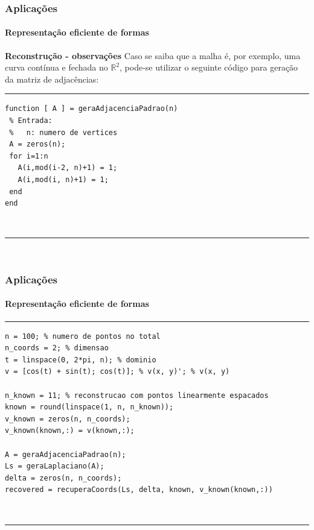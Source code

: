 \begin{frame}[fragile]
\frametitle{{\bf \color{blue} Aplicações}}
\framesubtitle{\color{blue} Representação eficiente de formas}

\begin{block}{\bf Reconstrução - observações}
Caso se saiba que a malha é, por exemplo, uma curva contínua e fechada no $\mathbb{R}^2$, pode-se utilizar o seguinte código para geração da matriz de adjacências:
\end{block}

\begin{Codigo}
\noindent\rule{11.2cm}{1.pt}
\vspace{-0.2cm}
\begin{verbatim}
function [ A ] = geraAdjacenciaPadrao(n)
 % Entrada:
 %   n: numero de vertices
 A = zeros(n);
 for i=1:n
   A(i,mod(i-2, n)+1) = 1;
   A(i,mod(i, n)+1) = 1;
 end
end
\end{verbatim}\\
\vspace{-0.5cm}
\noindent\rule{11.2cm}{1.pt}\\
\end{Codigo}
\end{frame}


\begin{frame}[fragile]
\frametitle{{\bf \color{blue} Aplicações}}
\framesubtitle{\color{blue} Representação eficiente de formas}

\begin{Codigo}
\noindent\rule{11.2cm}{1.pt}
\vspace{-0.2cm}
\begin{verbatim}
n = 100; % numero de pontos no total
n_coords = 2; % dimensao
t = linspace(0, 2*pi, n); % dominio
v = [cos(t) + sin(t); cos(t)]; % v(x, y)'; % v(x, y)

n_known = 11; % reconstrucao com pontos linearmente espacados
known = round(linspace(1, n, n_known));
v_known = zeros(n, n_coords);
v_known(known,:) = v(known,:);

A = geraAdjacenciaPadrao(n);
Ls = geraLaplaciano(A);
delta = zeros(n, n_coords);
recovered = recuperaCoords(Ls, delta, known, v_known(known,:))
\end{verbatim}\\
\vspace{-0.5cm}
\noindent\rule{11.2cm}{1.pt}\\
\end{Codigo}
\end{frame}


